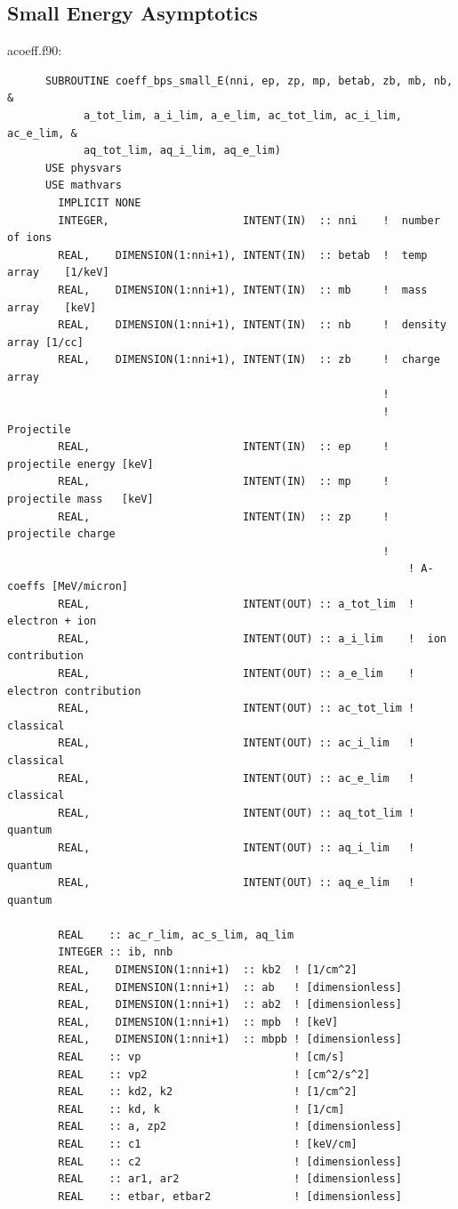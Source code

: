 \documentclass[preprint,12pt,eqsecnum,nofootinbib,amsmath,amssymb]{revtex4}
\begin{document}
\subsection{Small Energy Asymptotics}

\vskip1cm
\noindent
acoeff.f90:
{
\baselineskip 10pt
\begin{verbatim}
      SUBROUTINE coeff_bps_small_E(nni, ep, zp, mp, betab, zb, mb, nb,   &
            a_tot_lim, a_i_lim, a_e_lim, ac_tot_lim, ac_i_lim, ac_e_lim, &
            aq_tot_lim, aq_i_lim, aq_e_lim)
      USE physvars
      USE mathvars      
        IMPLICIT NONE
        INTEGER,                     INTENT(IN)  :: nni    !  number of ions
        REAL,    DIMENSION(1:nni+1), INTENT(IN)  :: betab  !  temp array    [1/keV]
        REAL,    DIMENSION(1:nni+1), INTENT(IN)  :: mb     !  mass array    [keV]
        REAL,    DIMENSION(1:nni+1), INTENT(IN)  :: nb     !  density array [1/cc]
        REAL,    DIMENSION(1:nni+1), INTENT(IN)  :: zb     !  charge array
                                                           !
                                                           ! Projectile  
        REAL,                        INTENT(IN)  :: ep     !  projectile energy [keV]
        REAL,                        INTENT(IN)  :: mp     !  projectile mass   [keV]
        REAL,                        INTENT(IN)  :: zp     !  projectile charge
                                                           !
                                                               ! A-coeffs [MeV/micron]
        REAL,                        INTENT(OUT) :: a_tot_lim  !  electron + ion
        REAL,                        INTENT(OUT) :: a_i_lim    !  ion contribution
        REAL,                        INTENT(OUT) :: a_e_lim    !  electron contribution
        REAL,                        INTENT(OUT) :: ac_tot_lim !  classical
        REAL,                        INTENT(OUT) :: ac_i_lim   !  classical
        REAL,                        INTENT(OUT) :: ac_e_lim   !  classical
        REAL,                        INTENT(OUT) :: aq_tot_lim !  quantum
        REAL,                        INTENT(OUT) :: aq_i_lim   !  quantum
        REAL,                        INTENT(OUT) :: aq_e_lim   !  quantum

        REAL    :: ac_r_lim, ac_s_lim, aq_lim
        INTEGER :: ib, nnb
        REAL,    DIMENSION(1:nni+1)  :: kb2  ! [1/cm^2]
        REAL,    DIMENSION(1:nni+1)  :: ab   ! [dimensionless]
        REAL,    DIMENSION(1:nni+1)  :: ab2  ! [dimensionless]
        REAL,    DIMENSION(1:nni+1)  :: mpb  ! [keV]
        REAL,    DIMENSION(1:nni+1)  :: mbpb ! [dimensionless]
        REAL    :: vp                        ! [cm/s]
        REAL    :: vp2                       ! [cm^2/s^2]
        REAL    :: kd2, k2                   ! [1/cm^2]
        REAL    :: kd, k                     ! [1/cm]
        REAL    :: a, zp2                    ! [dimensionless]
        REAL    :: c1                        ! [keV/cm]
        REAL    :: c2                        ! [dimensionless]
        REAL    :: ar1, ar2                  ! [dimensionless]
        REAL    :: etbar, etbar2             ! [dimensionless]


\end{verbatim}}
\end{document}
